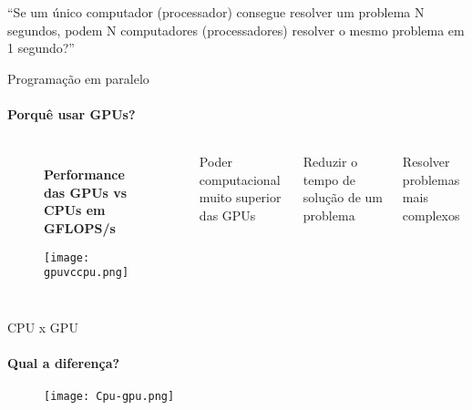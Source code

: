 \begin{frame}
    \begin{center}
        \vspace*{1.5cm}
        \justifying
        \huge{“Se um único computador (processador) consegue resolver um problema N segundos, podem N computadores (processadores) resolver o mesmo problema em 1 segundo?”}
    \end{center}
\end{frame}
\begin{frame}[t]{Programação em paralelo}
    \framesubtitle{Porquê usar GPUs?}
    \begin{columns}
        \begin{figure}
            \centering
            \textbf{Performance das GPUs vs CPUs em GFLOPS/s}\par\medskip
            \texttt{[image: gpuvccpu.png]}
        \end{figure}
        \itemize
        \item Poder computacional muito superior das GPUs
        \item Reduzir o tempo de solução de um problema
        \item Resolver problemas mais complexos
    \end{columns}
        
\end{frame}
\begin{frame}[t]{CPU x GPU}
    \framesubtitle{Qual a diferença?}
    \begin{figure}
        \texttt{[image: Cpu-gpu.png]}
    \end{figure}

\end{frame}
